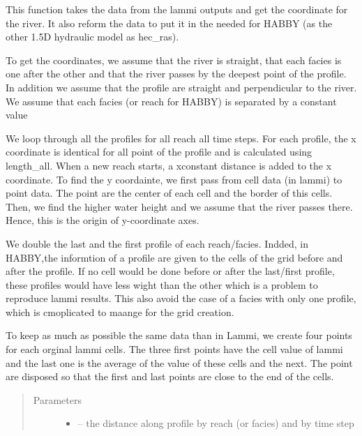 \documentclass[letterpaper,10pt,english]{sphinxmanual}
\begin{document}
\begin{fulllineitems}
\label{\detokenize{index:src.lammi.coord_lammi}}
This function takes the data from the lammi outputs and get the coordinate for the river. It also
reform the data to put it in the needed for HABBY (as the other 1.5D hydraulic model as hec\_ras).

To get the coordinates, we assume that the river is straight, that each facies is one after the other and
that the river passes by the deepest point of the profile. In addition we assume that the profile are straight
and perpendicular to the river. We assume that each facies (or reach for HABBY) is separated by a constant value

We loop through all the profiles for all reach all time steps. For each profile, the x coordinate is identical
for all point of the profile and is calculated using length\_all. When a new reach starts, a xconstant distance
is added to the x coordinate. To find the y coordainte, we first pass from cell data (in lammi) to point data.
The point are the center of each cell and the border of this cells.  Then, we find the higher water height and
we assume that the river passes there. Hence, this is the origin of y-coordinate axes.

We double the last and the first profile of each reach/facies. Indded, in HABBY,the informtion of a profile are
given to the cells of the grid before and after the profile. If no cell would be done before or after the last/first
profile, these profiles would have less wight than the other which is a problem to reproduce lammi results. This
also avoid the case of a facies with only one profile, which is cmoplicated to maange for the grid creation.

To keep as much as possible the same data than in Lammi, we create four points for each orginal lammi cells. The
three first points have the cell value of lammi and the last one is the average of the value of these cells and
the next. The point are disposed so that the first and last points are close to the end of the cells.
\begin{quote}\begin{description}
\item[{Parameters}] \leavevmode\begin{itemize}
\item {} 
 -- the distance along profile by reach (or facies) and by time step


\end{itemize}
\end{description}
\end{quote}
\end{fulllineitems}
\end{document}
